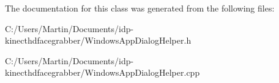 The documentation for this class was generated from the following files\+:\begin{DoxyCompactItemize}
\item 
C\+:/\+Users/\+Martin/\+Documents/idp-\/kinecthdfacegrabber/Windows\+App\+Dialog\+Helper.\+h\item 
C\+:/\+Users/\+Martin/\+Documents/idp-\/kinecthdfacegrabber/Windows\+App\+Dialog\+Helper.\+cpp\end{DoxyCompactItemize}
